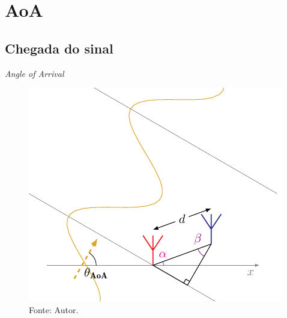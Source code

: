 \section{AoA}

    \subsection{Chegada do sinal}
    \begin{frame}{\textit{Angle of Arrival}}
        \begin{figure}
            \centering
            \caption*{$ \theta_\text{AoA} = \SI{60}{\degree} $, $\textcolor{cmyk_M}{\alpha_{k}}=\SI{20}{\degree}$, $ \textcolor{Purple}{\beta_{\pm k}} = \SI{40}{\degree} $}
            \includegraphics{../pictures/AoA_1}
            \caption*{\tiny Fonte: Autor.}
        \end{figure}
    \end{frame}

